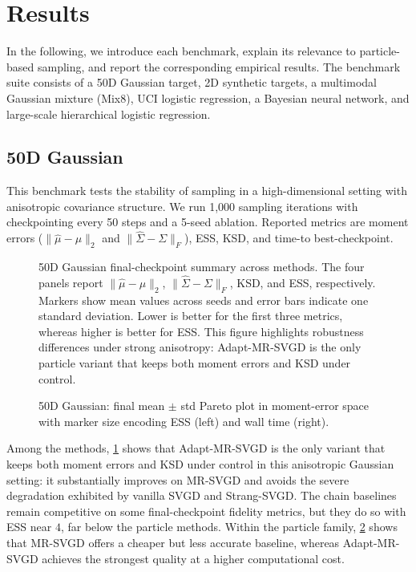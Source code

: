 \section{Results}
\label{sec:results}
\label{sec:experiments}

In the following, we introduce each benchmark, explain its relevance to
particle-based sampling, and report the corresponding empirical results. The
benchmark suite consists of a 50D Gaussian target, 2D synthetic targets, a
multimodal Gaussian mixture (Mix8), UCI logistic regression, a Bayesian neural
network, and large-scale hierarchical logistic regression.

\subsection{50D Gaussian}

This benchmark tests the stability of sampling in a high-dimensional setting with anisotropic
covariance structure. We run 1,000 sampling iterations with checkpointing every 50 steps
and a 5-seed ablation. Reported metrics are moment errors
($\|\hat{\mu}-\mu\|_2$ and $\|\hat{\Sigma}-\Sigma\|_F$), ESS, KSD, and time-to best-checkpoint.
\begin{figure}[t]
  \centering
  \caption{50D Gaussian final-checkpoint summary across methods. The four panels
  report $\|\hat{\mu}-\mu\|_2$, $\|\hat{\Sigma}-\Sigma\|_F$, KSD, and ESS,
  respectively. Markers show mean values across seeds and error bars indicate
  one standard deviation. Lower is better for the first three metrics, whereas
  higher is better for ESS. This figure highlights robustness differences under
  strong anisotropy: Adapt-MR-SVGD is the only particle variant that keeps both
  moment errors and KSD under control.}
  \label{fig:gauss50_summary}
\end{figure}

\begin{figure}[t]
  \centering
  \caption{50D Gaussian: final mean $\pm$ std Pareto plot in moment-error space
  with marker size encoding ESS (left) and wall time (right).}
  \label{fig:gauss50_pareto}
\end{figure}

Among the methods, \cref{fig:gauss50_summary} shows that
Adapt-MR-SVGD is the only variant that keeps both moment errors and KSD under
control in this anisotropic Gaussian setting: it substantially improves on
MR-SVGD and avoids the severe degradation exhibited by vanilla SVGD and
Strang-SVGD. The chain baselines remain competitive on some final-checkpoint
fidelity metrics, but they do so with ESS near $4$, far below the particle
methods. Within the particle family, \cref{fig:gauss50_pareto} shows that MR-SVGD offers
a cheaper but less accurate baseline, whereas Adapt-MR-SVGD
achieves the strongest quality at a higher computational cost.

